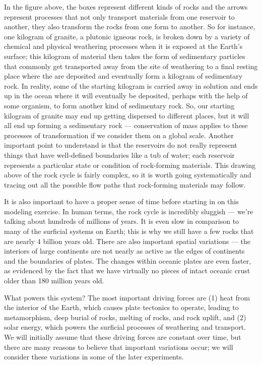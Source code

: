 \documentclass[11pt,letterpaper]{article}
\begin{document}
In the figure above, the boxes represent different kinds of rocks and the arrows represent processes that not only transport materials from one reservoir to another, they also transform the rocks from one form to another. So for instance, one kilogram of granite, a plutonic igneous rock, is broken down by a variety of chemical and physical weathering processes when it is exposed at the Earth's surface; this kilogram of material then takes the form of sedimentary particles that commonly get transported away from the site of weathering to a final resting place where the are deposited and eventually form a kilogram of sedimentary rock. In reality, some of the starting kilogram is carried away in solution and ends up in the ocean where it will eventually be deposited, perhaps with the help of some organism, to form another kind of sedimentary rock. So, our starting kilogram of granite may end up getting dispersed to different places, but it will all end up forming a sedimentary rock --- conservation of mass applies to these processes of transformation if we consider them on a global scale. Another important point to understand is that the reservoirs do not really represent things that have well-defined boundaries like a tub of water; each reservoir represents a particular state or condition of rock-forming materials. This drawing above of the rock cycle is fairly complex, so it is worth going systematically and tracing out all the possible flow paths that rock-forming materials may follow.

It is also important to have a proper sense of time before starting in on this modeling exercise. In human terms, the rock cycle is incredibly sluggish --- we're talking about hundreds of millions of years. It is even slow in comparison to many of the surficial systems on Earth; this is why we still have a few rocks that are nearly 4 billion years old. There are also important spatial variations --- the interiors of large continents are not nearly as active as the edges of continents and the boundaries of plates. The changes within oceanic plates are even faster, as evidenced by the fact that we have virtually no pieces of intact oceanic crust older than 180 million years old.

What powers this system? The most important driving forces are (1) heat from the interior of the Earth, which causes plate tectonics to operate, leading to metamorphism, deep burial of rocks, melting of rocks, and rock uplift, and (2) solar energy, which powers the surficial processes of weathering and transport. We will initially assume that these driving forces are constant over time, but there are many reasons to believe that important variations occur; we will consider these variations in some of the later experiments.
\end{document}
